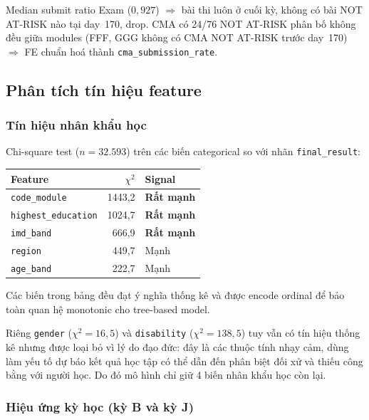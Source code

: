 Median submit ratio Exam ($0{,}927$) $\Rightarrow$ bài thi luôn ở cuối
kỳ, không có bài NOT AT-RISK nào tại day~170, drop. CMA có 24/76 NOT AT-RISK phân bố
không đều giữa modules (FFF, GGG không có CMA NOT AT-RISK trước day~170)
$\Rightarrow$ FE chuẩn hoá thành \texttt{cma\_submission\_rate}.

\subsection{Phân tích tín hiệu feature}

\subsubsection{Tín hiệu nhân khẩu học}

Chi-square test ($n = 32.593$) trên các biến categorical so với nhãn
\texttt{final\_result}:

\begin{center}
\small
\renewcommand{\arraystretch}{1.3}
\begin{tabular}{|l|r|l|}
\hline
\textbf{Feature} & \textbf{$\chi^2$} & \textbf{Signal} \\
\hline
\texttt{code\_module}       & 1443,2 & \textbf{Rất mạnh} \\
\texttt{highest\_education} & 1024,7 & \textbf{Rất mạnh} \\
\texttt{imd\_band}          &  666,9 & \textbf{Rất mạnh} \\
\texttt{region}             &  449,7 & Mạnh \\
\texttt{age\_band}          &  222,7 & Mạnh \\
\hline
\end{tabular}
\end{center}

Các biến trong bảng đều đạt ý nghĩa thống kê và được encode ordinal
để bảo toàn quan hệ monotonic cho tree-based model.

Riêng \texttt{gender} ($\chi^2 = 16{,}5$) và \texttt{disability}
($\chi^2 = 138{,}5$) tuy vẫn có tín hiệu thống kê nhưng được loại bỏ vì
lý do đạo đức: đây là các thuộc tính nhạy cảm, dùng làm yếu tố dự báo
kết quả học tập có thể dẫn đến phân biệt đối xử và thiếu công bằng với
người học. Do đó mô hình chỉ giữ 4 biến nhân khẩu học còn lại.

\subsubsection{Hiệu ứng kỳ học (kỳ B và kỳ J)}

